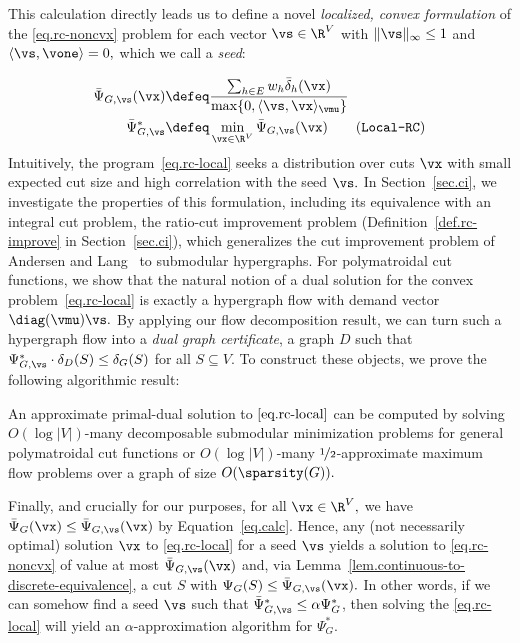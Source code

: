 \documentclass[letterpaper]{article}
\begin{document}
This calculation directly leads us to define a  novel \emph{localized, convex formulation} of the \eqref{eq.rc-noncvx} problem for each vector $\vs \in \R^V$ with $\|\vs\|_{\infty} \leq 1$ and $\langle \vs, \vone \rangle = 0,$ which we call a \emph{seed}:

\begin{align*}
\bar{\Psi}_{G,\vs}(\vx)
&\defeq \frac{\sum_{h \in E} w_h \bar{\delta}_h(\vx)}{\max\{0,\langle \vs, \vx \rangle_{\vmu}\}} \\
\bar{\Psi}_{G,\vs}^*
&\defeq \min_{\vx \in \R^V} \bar{\Psi}_{G,\vs}(\vx)
\stepcounter{equation}
\tag{\texttt{Local-RC}}
\label{eq.rc-local}
\end{align*}
Intuitively, the program~\eqref{eq.rc-local} seeks a distribution over cuts $\vx$ with small expected cut size and  high correlation with the seed $\vs.$
In Section~\ref{sec.ci}, we investigate the properties of this formulation, including its equivalence with an integral cut problem, the ratio-cut improvement problem (Definition~\ref{def.rc-improve} in Section~\ref{sec.ci}), which
generalizes the cut improvement problem of Andersen and Lang~\cite{Andersen-Lang} to submodular hypergraphs.
For polymatroidal cut functions, we show that the natural notion of a dual solution for the convex problem~\ref{eq.rc-local} is exactly a hypergraph flow with demand vector $\diag(\vmu) \vs.$
By applying our flow decomposition result, we can turn such a hypergraph flow into a \emph{dual graph certificate}, a graph $D$ such that $\Psi^*_{G,\vs} \cdot \delta_D(S) \leq \delta_G(S)$ for all $S \subseteq V.$
To construct these objects, we prove the following algorithmic result:
\begin{theorem}
\label{thm.informal-ci}
An approximate primal-dual solution to $\eqref{eq.rc-local}$ can be computed by solving $O(\log |V|)$-many decomposable submodular minimization problems for general polymatroidal cut functions or $O(\log |V|)$-many $\nicefrac{1}{2}$-approximate maximum flow problems over a graph of size $O(\sparsity(G)).$
\end{theorem}

Finally, and crucially for our purposes, for all $\vx \in \R^V,$ we have $\bar{\Psi}_G(\vx) \leq \bar{\Psi}_{G,\vs}(\vx)$ by Equation~\ref{eq.calc}. Hence, any (not necessarily optimal) solution $\vx$ to \eqref{eq.rc-local} for a seed $\vs$ yields a solution to \eqref{eq.rc-noncvx} of value at most $\bar{\Psi}_{G,\vs}(\vx)$ and, via Lemma~\ref{lem.continuous-to-discrete-equivalence}, a cut $S$ with $\Psi_G(S) \leq \bar{\Psi}_{G,\vs}(\vx).$
In other words, if we can somehow find a seed $\vs$ such that $\bar{\Psi}^*_{G,\vs} \leq \alpha \Psi^*_G$, then solving the \eqref{eq.rc-local} will yield an $\alpha$-approximation algorithm for $\Psi^*_G.$
\end{document}
